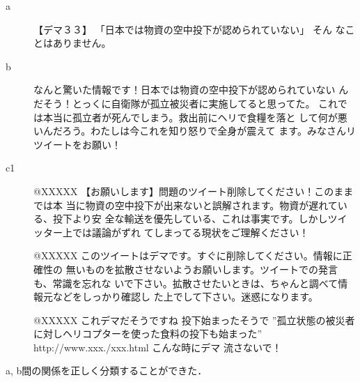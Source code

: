\documentclass[japanese]{jnlp_1.4}
\newcommand{\addspan}[1]{}
\begin{document}
\addspan{ネットワーク拡張手法と，文間関係認識手法1および2を比較して，ネットワーク
拡張手法でのみ正しく分類できた事例として，「救援物資の空中投下は法律で禁
止されている」の反論事例の一つを以下に示す．}
\begin{description}
 \item[a] 【デマ３３】 「日本では物資の空中投下が認められていない」 そん
	    なことはありません。
 \item[b] なんと驚いた情報です！日本では物資の空中投下が認められていない
	    んだそう！とっくに自衛隊が孤立被災者に実施してると思ってた。
	    これでは本当に孤立者が死んでしまう。救出前にヘリで食糧を落と
	    して何が悪いんだろう。わたしは今これを知り怒りで全身が震えて
	    ます。みなさんリツイートをお願い！
\end{description}
\addspan{a，bのいずれも，「法律」については言及されておらず，さらにaは括弧による引
用に対して否定する構造となっていたため，文間関係認識手法1，2のいずれも反
論関係に分類できなかった．ネットワーク拡張手法では，片方をリツイート・も
う片方に返信のパターン（図\ref{fig:RT_and_repqt}）によって分類された．パ
ターン中のc1として使われたツイート，すなわちaをリツイートしたユーザによる
ツイートbへの返信は全部で7ツイート存在した．
そのうちの3つを以下に示す．}


\begin{description}
\item[c1] @XXXXX 【お願いします】問題のツイート削除してください！このままでは本
当に物資の空中投下が出来ないと誤解されます。物資が遅れている、投下より安
全な輸送を優先している、これは事実です。しかしツイッター上では議論がずれ
てしまってる現状をご理解ください！
 \item[] @XXXXX このツイートはデマです。すぐに削除してください。情報に正確性の
無いものを拡散させないようお願いします。ツイートでの発言も、常識を忘れな
いで下さい。拡散させたいときは、ちゃんと調べて情報元などをしっかり確認し
た上でして下さい。迷惑になります。
 \item[] @XXXXX これデマだそうですね 投下始まったそうで ''孤立状態の被災者
に対しヘリコプターを使った食料の投下も始まった''
http://www.xxx./xxx.html こんな時にデマ
流さないで！
\end{description}
\addspan{
これらのツイートは全て反論であり，他の4ツイートも全て反論であった．
返信の分類器によりこれらを正しく「反論」と分類できたため，最終的に出力されるスコアも「反論」が最も高く，
}
a, b間の関係を正しく分類することができた．
\end{document}
